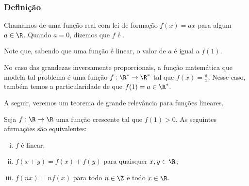 \subsubsection{Definição}

\begin{definition}
    Chamamos de  uma função real com lei de formação
$f(x) = ax$ para algum $a \in \R$. Quando $a = 0$, dizemos que $f$ é .
\end{definition}

\begin{remark}
Note que, sabendo que uma função é linear, o valor de $a$ é igual a
$f(1)$.
\end{remark}

No caso das grandezas inversamente proporcionais, a função
matemática que modela tal problema é uma função $f: \R^* \to
\R^*$ tal que $f(x) = \frac a x$. 
Nesse caso, também temos a
particularidade de que $f(1) = a \in \R^*$.

A seguir, veremos um teorema de grande relevância para funções lineares.

\begin{theorem}
\label{def:teorema-fundamental-proporcionalidade}
Seja $f: \R \to \R$ uma função crescente tal que $f(1)>0$. 
As seguintes afirmações são equivalentes:
%
\begin{enumerate}[(i)]
  \item $f$ é linear;
  \item $f(x+y) = f(x) + f(y)$ para quaisquer $x, y \in \R$;
  \item $f(nx) = nf(x)$ para todo $n \in \Z$ e todo $x \in \R$.
\end{enumerate}
\end{theorem}

